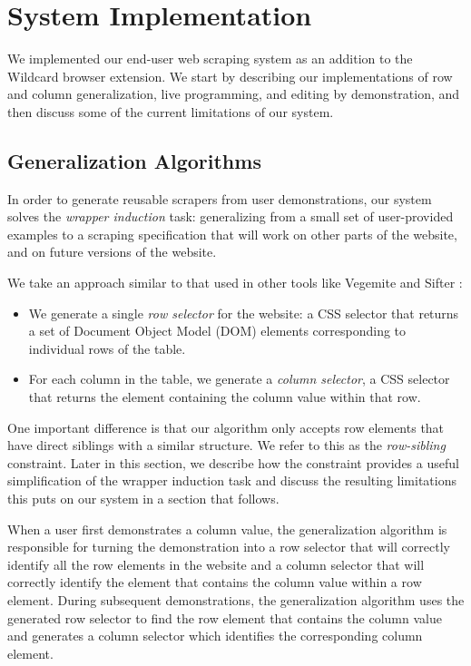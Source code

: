\documentclass[sigconf,10pt]{acmart}
\providecommand{\tightlist}{%
  \setlength{\itemsep}{0pt}\setlength{\parskip}{0pt}}
\begin{document}
\hypertarget{sec:implementation}{%
\section{System Implementation}\label{sec:implementation}}

We implemented our end-user web scraping system as an addition to the
Wildcard browser extension. We start by describing our implementations
of row and column generalization, live programming, and editing by
demonstration, and then discuss some of the current limitations of our
system.

\hypertarget{generalization-algorithms}{%
\subsection{Generalization Algorithms}\label{generalization-algorithms}}

In order to generate reusable scrapers from user demonstrations, our
system solves the \emph{wrapper induction} \citep{kushmerick2000} task:
generalizing from a small set of user-provided examples to a scraping
specification that will work on other parts of the website, and on
future versions of the website.

We take an approach similar to that used in other tools like Vegemite
\citep{lin2009} and Sifter \citep{huynh2006}:

\begin{itemize}
\tightlist
\item
  We generate a single \emph{row selector} for the website: a CSS
  selector that returns a set of Document Object Model (DOM) elements
  corresponding to individual rows of the table.
\item
  For each column in the table, we generate a \emph{column selector}, a
  CSS selector that returns the element containing the column value
  within that row.
\end{itemize}

One important difference is that our algorithm only accepts row elements
that have direct siblings with a similar structure. We refer to this as
the \emph{row-sibling} constraint. Later in this section, we describe
how the constraint provides a useful simplification of the wrapper
induction task and discuss the resulting limitations this puts on our
system in a section that follows.

When a user first demonstrates a column value, the generalization
algorithm is responsible for turning the demonstration into a row
selector that will correctly identify all the row elements in the
website and a column selector that will correctly identify the element
that contains the column value within a row element. During subsequent
demonstrations, the generalization algorithm uses the generated row
selector to find the row element that contains the column value and
generates a column selector which identifies the corresponding column
element.
\end{document}
